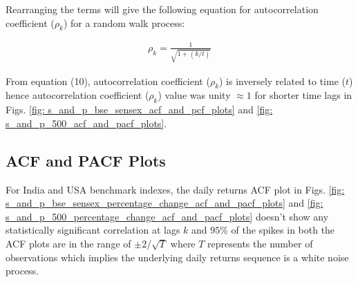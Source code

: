 \documentclass[conference]{IEEEtran}
\begin{document}
Rearranging the terms will give the following equation for autocorrelation coefficient ($\rho_{k}$) for a random walk process:

\begin{align}
    \rho_{k} = \frac{1}{\sqrt{1 + (k / t)}} \label{eq: 10}
\end{align}

From equation (10), autocorrelation coefficient ($\rho_{k}$) is inversely related to time ($t$) hence autocorrelation coefficient ($\rho_{k}$) value was unity $\approx 1$ for shorter time lags in Figs. \ref{fig: s_and_p_bse_sensex_acf_and_pcf_plots} and \ref{fig: s_and_p_500_acf_and_pacf_plots}.
\subsection{ACF and PACF Plots}

For India and USA benchmark indexes, the daily returns ACF plot in Figs. \ref{fig: s_and_p_bse_sensex_percentage_change_acf_and_pacf_plots} and \ref{fig: s_and_p_500_percentage_change_acf_and_pacf_plots} doesn't show any statistically significant correlation at lags $k$ and $95\%$ of the spikes in both the ACF plots are in the range of $\pm 2/\sqrt{T}$ where $T$ represents the number of observations which implies the underlying daily returns sequence is a white noise process.
\end{document}
